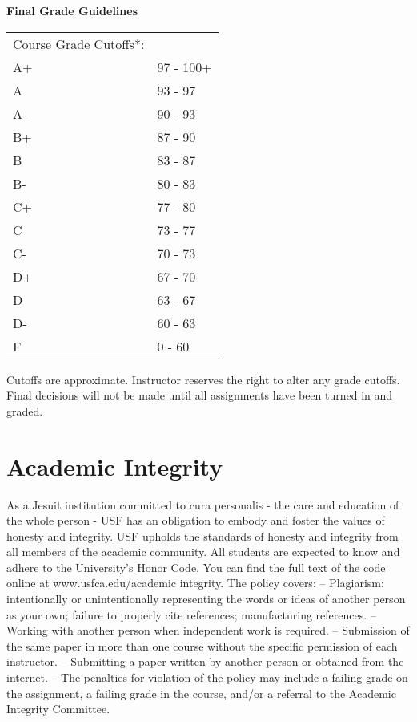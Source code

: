 \documentclass[10pt, oneside]{article}
\begin{document}
\noindent \textbf{Final Grade Guidelines}
\begin{table}[ht]
	\small
	\begin{tabular}{ll}
		Course Grade Cutoffs*: & \\
		A+	&97 - 100+ \\
		A	  &93 - 97 \\
		A-	&90 - 93 \\
		B+	&87 - 90 \\
		B	  &83 - 87 \\
		B-	&80 - 83 \\
		C+	&77 - 80 \\
		C	  &73 - 77 \\
		C-	&70 - 73 \\
		D+	&67 - 70 \\
		D	  &63 - 67 \\
		D-	&60 - 63 \\
		F	  &0 - 60 \\ 
	\end{tabular}
\end{table}


\noindent * Cutoffs are approximate.  Instructor reserves the right to alter any grade cutoffs.  Final decisions will not be made until all assignments have been turned in and graded. 


\section*{Academic Integrity}
As a Jesuit institution committed to cura personalis - the care and education of the whole person - USF has an obligation to embody and foster the values of honesty and integrity. USF upholds the standards of honesty and integrity from all members of the academic community. All students are expected to know and adhere to the University’s Honor Code. You can find the full text of the code online at www.usfca.edu/academic integrity. The policy covers:
– Plagiarism: intentionally or unintentionally representing the words or ideas of another person as your own; failure to properly cite references; manufacturing references.
– Working with another person when independent work is required.
– Submission of the same paper in more than one course without the specific permission of each instructor.
– Submitting a paper written by another person or obtained from the internet.
– The penalties for violation of the policy may include a failing grade on the assignment, a failing grade in the course, and/or a referral to the Academic Integrity Committee.
\end{document}
